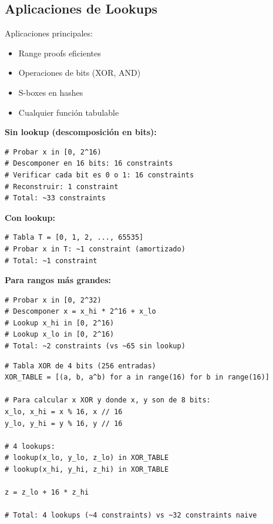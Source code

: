 \documentclass[11pt,a4paper,twoside]{book}
\begin{document}
\subsection{Aplicaciones de Lookups}

Aplicaciones principales:
\begin{itemize}
    \item Range proofs eficientes
    \item Operaciones de bits (XOR, AND)
    \item S-boxes en hashes
    \item Cualquier funci\'on tabulable
\end{itemize}

\begin{example}
\textbf{Sin lookup (descomposici\'on en bits):}
\begin{lstlisting}[style=python]
# Probar x in [0, 2^16)
# Descomponer en 16 bits: 16 constraints
# Verificar cada bit es 0 o 1: 16 constraints
# Reconstruir: 1 constraint
# Total: ~33 constraints
\end{lstlisting}

\textbf{Con lookup:}
\begin{lstlisting}[style=python]
# Tabla T = [0, 1, 2, ..., 65535]
# Probar x in T: ~1 constraint (amortizado)
# Total: ~1 constraint
\end{lstlisting}

\textbf{Para rangos m\'as grandes:}
\begin{lstlisting}[style=python]
# Probar x in [0, 2^32)
# Descomponer x = x_hi * 2^16 + x_lo
# Lookup x_hi in [0, 2^16)
# Lookup x_lo in [0, 2^16)
# Total: ~2 constraints (vs ~65 sin lookup)
\end{lstlisting}
\end{example}

\begin{example}
\begin{lstlisting}[style=python]
# Tabla XOR de 4 bits (256 entradas)
XOR_TABLE = [(a, b, a^b) for a in range(16) for b in range(16)]

# Para calcular x XOR y donde x, y son de 8 bits:
x_lo, x_hi = x % 16, x // 16
y_lo, y_hi = y % 16, y // 16

# 4 lookups:
# lookup(x_lo, y_lo, z_lo) in XOR_TABLE
# lookup(x_hi, y_hi, z_hi) in XOR_TABLE

z = z_lo + 16 * z_hi

# Total: 4 lookups (~4 constraints) vs ~32 constraints naive
\end{lstlisting}
\end{example}
\end{document}

